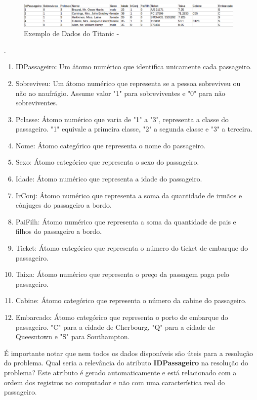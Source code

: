 \begin{figure}[!h]
\centering
\includegraphics[keepaspectratio=true,scale=0.40]
{figuras/dataEg.eps}
\caption{Exemplo de Dados do Titanic - \cite{titanic2012}}
\label{data_titatic}
\end{figure}
. 

\begin{enumerate}
\item IDPassageiro: Um átomo numérico que identifica unicamente cada passageiro.
\item Sobreviveu: Um átomo numérico que representa se a pessoa sobreviveu ou não ao naufrágio. Assume valor "1" para sobreviventes e "0" para não sobreviventes.
\item Pclasse: Átomo numérico que varia de "1" a "3", representa a classe do passageiro. "1" equivale a primeira classe, "2" a segunda classe e "3" a terceira.
\item Nome: Átomo categórico que representa o nome do passageiro.
\item Sexo: Átomo categórico que representa o sexo do passageiro.
\item Idade: Átomo numérico que representa a idade do passageiro.
\item IrConj: Átomo numérico que representa a soma da quantidade de irmãos e cônjuges do passageiro a bordo.
\item PaiFilh: Átomo numérico que representa a soma da quantidade de pais e filhos do passageiro a bordo.
\item Ticket: Átomo categórico que representa o número do ticket de embarque do passageiro.
\item Taixa: Átomo numérico que representa o preço da passagem paga pelo passageiro.
\item Cabine: Átomo categórico que representa o número da cabine do passageiro.
\item Embarcado: Átomo categórico que representa o porto de embarque do passageiro. "C"  para a cidade de Cherbourg, "Q"  para a cidade de Queesntown e "S"  para Southampton.
\end{enumerate}


É importante notar que nem todos os dados disponíveis são úteis para a resolução do problema. Qual seria a relevância do atributo \textbf{IDPassageiro} na resolução do problema? Este atributo é gerado automaticamente e está relacionado com a ordem dos registros no computador e não com uma característica real do passageiro. 


